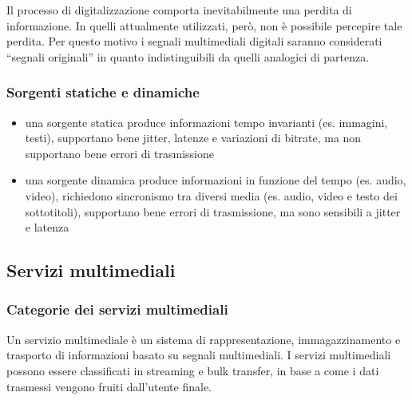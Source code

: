 Il processo di digitalizzazione comporta inevitabilmente una perdita di informazione. In quelli attualmente utilizzati,
però, non è possibile percepire tale perdita. Per questo motivo i segnali multimediali digitali saranno considerati
``segnali originali'' in quanto indistinguibili da quelli analogici di partenza.

\subsubsection*{Sorgenti statiche e dinamiche}
\begin{itemize}
	\item una sorgente statica produce informazioni tempo invarianti (es. immagini, testi), supportano bene jitter, latenze
	e variazioni di bitrate, ma non supportano bene errori di trasmissione
	\item una sorgente dinamica produce informazioni in funzione del tempo (es. audio, video), richiedono sincronismo tra
	diversi media (es. audio, video e testo dei sottotitoli), supportano bene errori di trasmissione, ma sono sensibili
	a jitter e latenza	
\end{itemize}

\subsection{Servizi multimediali}
\subsubsection*{Categorie dei servizi multimediali}
Un servizio multimediale è un sistema di rappresentazione, immagazzinamento e trasporto di informazioni basato su segnali
multimediali. I servizi multimediali possono essere classificati in streaming e bulk transfer, in base a come i dati
trasmessi vengono fruiti dall'utente finale.

